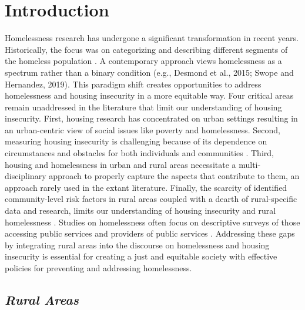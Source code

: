 \chapter{Introduction} 

Homelessness research has undergone a significant transformation in recent years. Historically, the focus was on categorizing and describing different segments of the homeless population \citep{lee_homelessness_2021}. A contemporary approach views homelessness as a spectrum rather than a binary condition (e.g., Desmond et al., 2015; Swope and Hernandez, 2019). This paradigm shift creates opportunities to address homelessness and housing insecurity in a more equitable way. Four critical areas remain unaddressed in the literature that limit our understanding of housing insecurity. First, housing research has concentrated on urban settings resulting in an urban-centric view of social issues like poverty and homelessness. Second, measuring housing insecurity is challenging because of its dependence on circumstances and obstacles for both individuals and communities \citep{leifheit_building_2022}. Third, housing and homelessness in urban and rural areas necessitate a multi-disciplinary approach to properly capture the aspects that contribute to them, an approach rarely used in the extant literature.  Finally, the scarcity of identified community-level risk factors in rural areas coupled with a dearth of rural-specific data and research, limits our understanding of housing insecurity and rural homelessness \citep{gleason_using_2021}. Studies on homelessness often focus on descriptive surveys of those accessing public services and providers of public services \citep{robertson_rural_2007}. Addressing these gaps by integrating rural areas into the discourse on homelessness and housing insecurity is essential for creating a just and equitable society with effective policies for preventing and addressing homelessness\citep{oregan_how_2021}.

\section{\textit{Rural Areas}}

